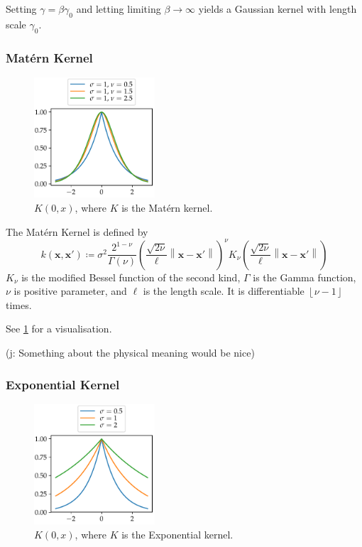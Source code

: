 \documentclass[11pt,twoside]{report}
\newcommand\bx{\mathbf{x}}
\newcommand\norm[1]{\left\|#1\right\|}
\newcommand\floor[1]{\left\lfloor#1\right\rfloor}
\newcommand\jakub[1]{{\color{red}(j: #1)}}
\begin{document}
Setting $\gamma = \beta \gamma_0$ and letting limiting $\beta \to \infty$ yields a Gaussian kernel with length scale $\gamma_0$.

\subsubsection{Mat\'ern Kernel}

  \begin{figure}
    \centering
    \includegraphics[width=0.4\textwidth]{matern_kernel_plot.pdf}
    \caption{$K(0, x)$, where $K$ is the Mat\'ern kernel.}
    \label{fig:matern_kernel}
  \end{figure}

The Mat\'ern Kernel is defined by \[
    k(\bx, \bx') \coloneqq \sigma^2\frac{2^{1-\nu}}{\Gamma(\nu)}\left(\frac{\sqrt{2\nu}}{\ell}\norm{\bx - \bx'}\right)^\nu K_\nu\left(\frac{\sqrt{2\nu}}{\ell}\norm{\bx - \bx'}\right)
\]$K_\nu$ is the modified Bessel function of the second kind, $\Gamma$ is the Gamma function, $\nu$ is positive parameter, and $\ell$ is the length scale. It is differentiable $\floor{\nu-1}$ times.

See \cref{fig:matern_kernel} for a visualisation.

\jakub{Something about the physical meaning would be nice}

\subsubsection{Exponential Kernel}

  \begin{figure}
    \centering
    \includegraphics[width=0.4\textwidth]{exponential_kernel_plot.pdf}
    \caption{$K(0, x)$, where $K$ is the Exponential kernel.}
    \label{fig:exponential_kernel}
  \end{figure}
\end{document}
